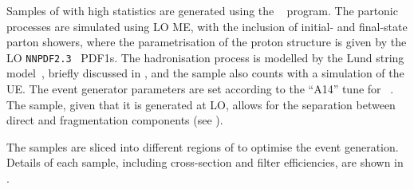 
Samples of \gammajet with high statistics are generated using the ~\cite{Pythia8.1} program. The partonic processes are simulated using \ac{LO} \ac{ME}, with the inclusion of initial- and final-state parton showers, where the parametrisation of the proton structure is given by the \ac{LO} \texttt{NNPDF2.3}~\cite{NNPDF2} \acp{PDF1}.
The hadronisation process is modelled by the Lund string model~\cite{Anderson-1983}, briefly discussed in \Sect{\ref{subsec:theory:mc_simulation:hadronisation}}, and the sample also counts with a simulation of the \ac{UE}.
The event generator parameters are set according to the “A14” tune for \Pythia~\cite{Pythia-A14Tune}.
The \pythia sample, given that it is generated at \ac{LO}, allows for the separation between direct and fragmentation components (see \Sect{\ref{subsec:theory:sm:prompt_photon}}).

The samples are sliced into different regions of \pt to optimise the event generation. Details of each sample, including cross-section and filter efficiencies, are shown in \Tab{\ref{tab:samples:samples:bkg:samples}}.

